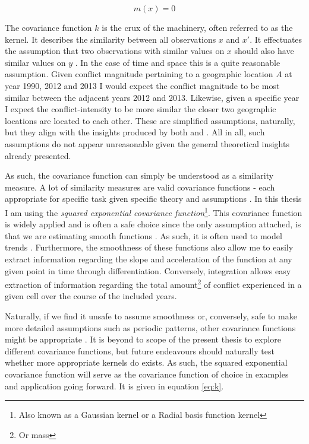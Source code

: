 \documentclass[a4paper]{article}
\begin{document}
\[
m(x) = 0 \tag{6} \label{eq:m}
\]

The covariance function $k$ is the crux of the machinery, often referred to as the kernel. It describes the similarity between all observations $x$ and $x'$. It effectuates the assumption that two observations with similar values on $x$ should also have similar values on $y$ \cite[79]{williams2006gaussian}. In the case of time and space this is a quite reasonable assumption. Given conflict magnitude pertaining to a geographic location $A$ at year 1990, 2012 and 2013 I would expect the conflict magnitude to be most similar between the adjacent years 2012 and 2013. Likewise, given a specific year I expect the conflict-intensity to be more similar the closer two geographic locations are located to each other. These are simplified assumptions, naturally, but they align with the insights produced by both \cite{weidmann_ward_2010predicting} and \cite{schutte2011diffusion}. All in all, such assumptions do not appear unreasonable given the general theoretical insights already presented.\par 

As such, the covariance function can simply be understood as a similarity measure. A lot of similarity measures are valid covariance functions - each appropriate for specific task given specific theory and assumptions \citep[79]{williams2006gaussian}. In this thesis I am using the \emph{squared exponential covariance function}\footnote{Also known as a Gaussian kernel or a Radial basis function kernel}. This covariance function is widely applied and is often a safe choice since the only assumption attached, is that we are estimating smooth functions \citep[84]{williams2006gaussian}. As such, it is often used to model trends \cite[119]{williams2006gaussian}. Furthermore, the smoothness of these functions also allow me to easily extract information regarding the slope and acceleration of the function at any given point in time through differentiation. Conversely, integration allows easy extraction of information regarding the total amount\footnote{Or mass} of conflict experienced in a given cell over the course of the included years.\par

Naturally, if we find it unsafe to assume smoothness or, conversely, safe to make more detailed assumptions such as periodic patterns, other covariance functions might be appropriate \citep[502-503]{Gelman_2013}. It is beyond to scope of the present thesis to explore different covariance functions, but future endeavours should naturally test whether more appropriate kernels do exists. As such, the squared exponential covariance function will serve as the covariance function of choice in examples and application going forward. It is given in equation \ref{eq:k}.\par
\end{document}
